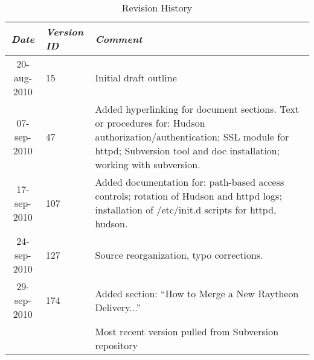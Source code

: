 
\newpage
\begin{table}
\caption{Revision History}
\begin{tabular}{|c|p{0.5in}|p{3.0in}|}

\hline
{\em Date} & {\em Version ID} & {\em Comment} \\

\hline
	20-aug-2010
&
	15
&
	Initial draft outline
\\

\hline
	07-sep-2010
&
	47
&
Added hyperlinking for document sections.  Text or procedures for: Hudson
authorization/authentication; SSL module for httpd; Subversion tool and
doc installation; working with subversion.
\\

\hline
	17-sep-2010
&
	107
&
Added documentation for: path-based access controls; rotation of 
Hudson and httpd logs; installation of /etc/init.d scripts for 
httpd, hudson.
\\

\hline
	24-sep-2010
&
	127
&
Source reorganization, typo corrections.
\\

\hline
	29-sep-2010
&
	174
&
Added section: ``How to Merge a New Raytheon Delivery...''
\\

\hline
	
&
	
& 
	Most recent version pulled from Subversion repository
\\



\hline
\end{tabular}
\end{table}

\newpage


